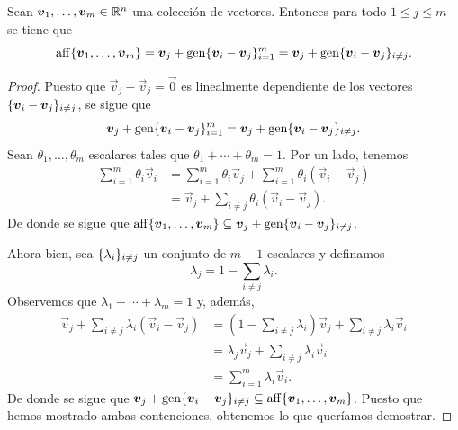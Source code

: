 \begin{lemma}
	\label{lemma:aff}
	Sean $\boldsymbol{v}_1, \ldots, \boldsymbol{v}_m \in \mathbb{R}^n$ una colección de vectores. Entonces
	para todo $1 \leq j \leq m$ se tiene que
	\begin{equation*}
		\operatorname{aff}\lbrace \boldsymbol{v}_1, \ldots, \boldsymbol{v}_m \rbrace = \boldsymbol{v}_j + \operatorname{gen}\lbrace \boldsymbol{v}_i -
		\boldsymbol{v}_j \rbrace_{i=1}^{m} = \boldsymbol{v}_j + \operatorname{gen}\lbrace \boldsymbol{v}_i - \boldsymbol{v}_j \rbrace_{i\neq j}.
	\end{equation*}
\end{lemma}
\begin{proof}
	Puesto que $\vec{v}_j - \vec{v}_j = \vec{0}$ es linealmente dependiente de los vectores
	$\lbrace \boldsymbol{v}_i - \boldsymbol{v}_j \rbrace_{i \neq j}$, se sigue que
	\begin{equation*}
		\boldsymbol{v}_j + \operatorname{gen}\lbrace \boldsymbol{v}_i - \boldsymbol{v}_j \rbrace_{i = 1}^{m}
		=
		\boldsymbol{v}_j + \operatorname{gen}\lbrace \boldsymbol{v}_i - \boldsymbol{v}_j \rbrace_{i \neq j}.
	\end{equation*}
	Sean $\theta_1, \ldots, \theta_m$ escalares tales que $\theta_1 + \cdots + \theta_m = 1$. Por un
	lado, tenemos
	\begin{align*}
		\sum_{i=1}^{m}\theta_i\vec{v}_i
		&= \sum_{i=1}^{m}\theta_i\vec{v}_j + \sum_{i=1}^{m}\theta_i(\vec{v}_i - \vec{v}_j)  \\
		&= \vec{v}_j  + \sum_{i \neq j}\theta_i(\vec{v}_i - \vec{v}_j).
	\end{align*}
	De donde se sigue que $\operatorname{aff}\lbrace \boldsymbol{v}_1, \ldots, \boldsymbol{v}_m \rbrace \subseteq \boldsymbol{v}_j +
	\operatorname{gen}\lbrace \boldsymbol{v}_i - \boldsymbol{v}_j \rbrace_{i \neq j}$.

	Ahora bien, sea $\lbrace \lambda_i \rbrace_{i \neq j}$ un conjunto de $m - 1$ escalares y definamos
	\begin{equation*}
		\lambda_j = 1 - \sum_{i \neq j}\lambda_i.
	\end{equation*}
	Observemos que $\lambda_1 + \cdots + \lambda_m = 1$ y, además,
	\begin{align*}
		\vec{v}_j + \sum_{i \neq j}\lambda_i(\vec{v}_i - \vec{v}_j)
		&= \left(1 - \sum_{i \neq j}\lambda_i\right)\vec{v}_j
		+ \sum_{i \neq j}\lambda_i\vec{v}_i \\
		&= \lambda_j\vec{v}_j + \sum_{i \neq j}\lambda_i\vec{v}_i \\
		&= \sum_{i = 1}^{m}\lambda_i\vec{v}_i.
	\end{align*}
	De donde se sigue que $\boldsymbol{v}_j + \operatorname{gen}\lbrace \boldsymbol{v}_i - \boldsymbol{v}_j \rbrace_{i \neq j} \subseteq
	\operatorname{aff}\lbrace \boldsymbol{v}_1, \ldots, \boldsymbol{v}_m \rbrace$. Puesto que hemos mostrado ambas contenciones,
	obtenemos lo que queríamos demostrar.
\end{proof}
